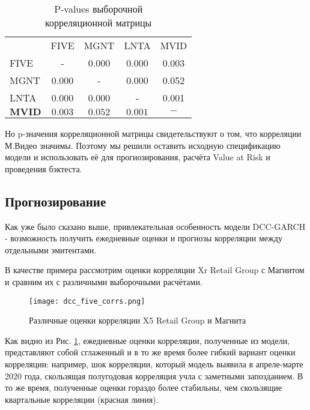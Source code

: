 \documentclass[a4paper,11pt]{article}
\begin{document}
\begin{table}[htbp]
  \centering
  \captionsetup{font=large}
  \caption{P-values выборочной \\ корреляционной матрицы}
    \begin{tabular}{lcccc}
          & FIVE  & MGNT  & LNTA  & MVID \\
    FIVE  & -     & 0.000 & 0.000 & 0.003 \\
    MGNT  & 0.000 & -     & 0.000 & 0.052 \\
    LNTA  & 0.000 & 0.000 & -     & 0.001 \\
    $\mathbf{MVID}$ & $\mathbf{0.003}$ & $\mathbf{0.052}$ & $\mathbf{0.001}$ & $\mathbf{-}$ \\
    \end{tabular}%
  \label{tab:addlabel}%
\end{table}%

Но p-значения корреляционной матрицы свидетельствуют о том, что корреляции М.Видео значимы. Поэтому мы решили оставить исходную спецификацию модели и использовать её для прогнозирования, расчёта Value at Risk и проведения бэктеста.

\subsection{Прогнозирование}\label{forecasting}

Как уже было сказано выше, привлекательная особенность модели DCC-GARCH - возможность получить ежедневные оценки и прогнозы корреляции между отдельными эмитентами.

В качестве примера рассмотрим оценки корреляции Xr Retail Group с Магнитом и сравним их с различными выборочными расчётами.

\begin{figure}[h]
  \advance\leftskip-1.2cm
    \texttt{[image: dcc\_five\_corrs.png]}
    \caption{Различные оценки корреляции X5 Retail Group и Магнита}
    \label{fig:five_mgnt_corrs}
\end{figure}

Как видно из Рис. \ref{fig:five_mgnt_corrs}, ежедневные оценки корреляции, полученные из модели, представляют собой сглаженный и в то же время более гибкий вариант оценки корреляции: например, шок корреляции, который модель выявила в апреле-марте 2020 года, скользящая полугодовая корреляция учла с заметными запозданием. В то же время, полученные оценки гораздо более стабильны, чем скользящие квартальные корреляции (красная линия).
\end{document}
